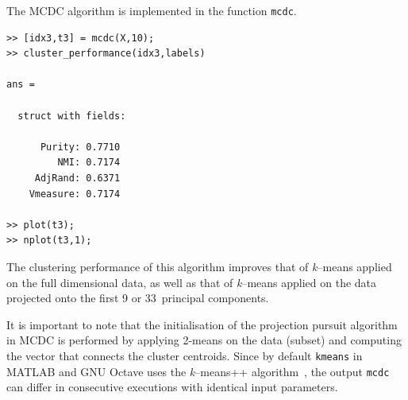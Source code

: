 \documentclass{book}
\begin{document}
The MCDC algorithm is implemented in the function {\tt mcdc}.

\begin{verbatim}
>> [idx3,t3] = mcdc(X,10);
>> cluster_performance(idx3,labels)

ans = 

  struct with fields:

      Purity: 0.7710
         NMI: 0.7174
     AdjRand: 0.6371
    Vmeasure: 0.7174

>> plot(t3);
>> nplot(t3,1);
\end{verbatim}

\noindent
%
The clustering performance of this algorithm improves that of {\it k}--means applied
on the full dimensional data, as well as that of {\it k}--means applied on
the data projected onto the first 9 or 33~principal components.

It is important to note
that the initialisation of the projection pursuit algorithm in MCDC is performed by
applying 2-means on the data (subset) and computing the vector that connects
the cluster centroids. Since by default {\tt kmeans} in MATLAB
and GNU Octave uses the {\it k}--means++ algorithm~\cite{ArthurV2007}, 
the output {\tt mcdc} can differ in consecutive executions with
identical input parameters.
\end{document}

